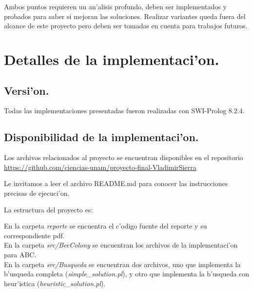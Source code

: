 \documentclass[12pt]{article}
\begin{document}
    Ambos puntos requieren un an'alisis profundo, deben ser implementados y probados
    para saber si mejoran las soluciones.
    Realizar variantes queda fuera del alcance de este proyecto pero
    deben ser tomadas en cuenta para trabajos futuros.


    \section{Detalles de la implementaci'on.}
    
    \subsection{Versi'on.}
    Todas las implementaciones presentadas fueron realizadas con SWI-Prolog 8.2.4.

    \subsection{Disponibilidad de  la implementaci'on.}

    Los archivos relacionados al proyecto se encuentran disponibles
    en el repositorio\\
    \href{https://github.com/ciencias-unam/proyecto-final-VladimirSierra }{https://github.com/ciencias-unam/proyecto-final-VladimirSierra}

    Le invitamos a leer el archivo README.md para
    conocer las instrucciones precisas de ejecuci'on.

    La estructura del proyecto es:

    En la carpeta \textit{ reporte } se encuentra el c'odigo fuente del reporte y su correspondiente pdf. \\
    En la carpeta \textit{src/BeeColony} se encuentran los archivos de la implementaci'on para ABC. \\
    En la carpeta \textit{ src/Busqueda } se encuentran dos archivos, uno que implementa la b'usqueda completa (\textit{simple\_solution.pl}), y otro que implementa
    la b'usqueda con heur'istica (\textit{heuristic\_solution.pl}).



    \printbibliography
\end{document}
